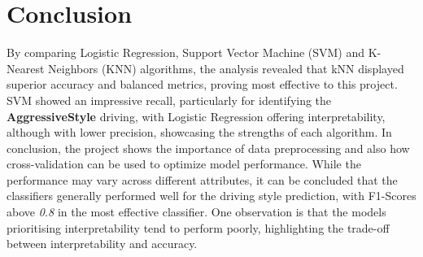 \documentclass[10pt,journal,compsoc]{IEEEtran}
\begin{document}
\section{Conclusion}
By comparing Logistic Regression, Support Vector Machine (SVM) and K-Nearest Neighbors (KNN) algorithms, the analysis revealed that kNN displayed superior accuracy and balanced metrics, proving most effective to this project. SVM showed an impressive recall, particularly for identifying the \textbf{AggressiveStyle} driving, with Logistic Regression offering interpretability, although with lower precision, showcasing the strengths of each algorithm.
In conclusion, the project shows the importance of data preprocessing and also how cross-validation can be used to optimize model performance. While the performance may vary across different attributes, it can be concluded that the classifiers generally performed well for the driving style prediction, with F1-Scores above \textit{0.8} in the most effective classifier. One observation is that the models prioritising interpretability tend to perform poorly, highlighting the trade-off between interpretability and accuracy.

\printbibliography
\end{document}
